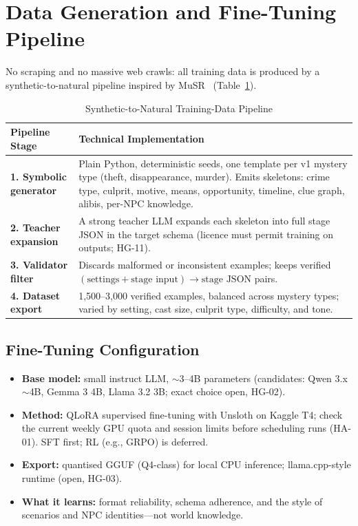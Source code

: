 \documentclass[11pt,a4paper]{article}
\providecommand{\toprule}{\hline\hline}
\providecommand{\midrule}{\hline}
\providecommand{\bottomrule}{\hline\hline}
\providecommand{\addlinespace}{\vspace{0.3em}}
\begin{document}
\section{Data Generation and Fine-Tuning Pipeline}
\label{sec:data}

No scraping and no massive web crawls: all training data is produced by a synthetic-to-natural pipeline inspired by MuSR~\cite{sprague2024musr} (Table~\ref{tab:data_pipeline}).

\begin{table}[htbp]
\centering
\small
\caption{Synthetic-to-Natural Training-Data Pipeline}
\label{tab:data_pipeline}
\begin{tabularx}{\textwidth}{lX}
\toprule
\textbf{Pipeline Stage} & \textbf{Technical Implementation} \\
\midrule
\textbf{1. Symbolic generator} & Plain Python, deterministic seeds, one template per v1 mystery type (theft, disappearance, murder). Emits skeletons: crime type, culprit, motive, means, opportunity, timeline, clue graph, alibis, per-NPC knowledge. \\
\addlinespace
\textbf{2. Teacher expansion} & A strong teacher LLM expands each skeleton into full stage JSON in the target schema (licence must permit training on outputs; HG-11). \\
\addlinespace
\textbf{3. Validator filter} & Discards malformed or inconsistent examples; keeps verified $(\text{settings} + \text{stage input}) \rightarrow \text{stage JSON}$ pairs. \\
\addlinespace
\textbf{4. Dataset export} & 1,500--3,000 verified examples, balanced across mystery types; varied by setting, cast size, culprit type, difficulty, and tone. \\
\bottomrule
\end{tabularx}
\end{table}

\subsection{Fine-Tuning Configuration}
\begin{itemize}
    \item \textbf{Base model:} small instruct LLM, $\sim$3--4B parameters (candidates: Qwen 3.x $\sim$4B, Gemma 3 4B, Llama 3.2 3B; exact choice open, HG-02).
    \item \textbf{Method:} QLoRA supervised fine-tuning with Unsloth on Kaggle T4; check the current weekly GPU quota and session limits before scheduling runs (HA-01). SFT first; RL (e.g., GRPO) is deferred.
    \item \textbf{Export:} quantised GGUF (Q4-class) for local CPU inference; llama.cpp-style runtime (open, HG-03).
    \item \textbf{What it learns:} format reliability, schema adherence, and the style of scenarios and NPC identities---not world knowledge.
\end{itemize}
\end{document}
